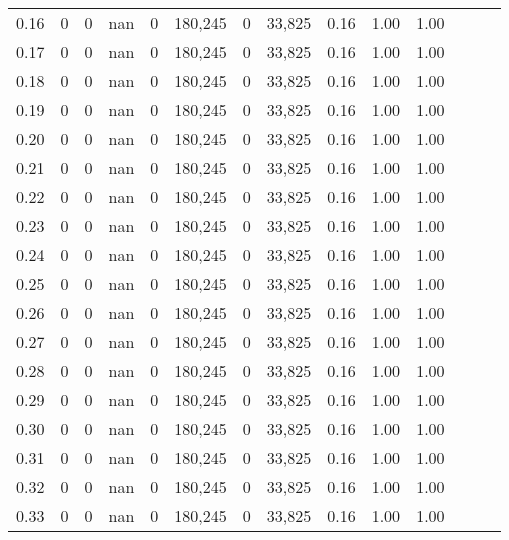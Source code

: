 \begin{tabular}{rrrrrrrrrrrrrr}
0.16 &        0 &       0 &   nan &        0 &  180,245 &       0 &  33,825 &  0.16 &  1.00 &      1.00 \\
0.17 &        0 &       0 &   nan &        0 &  180,245 &       0 &  33,825 &  0.16 &  1.00 &      1.00 \\
0.18 &        0 &       0 &   nan &        0 &  180,245 &       0 &  33,825 &  0.16 &  1.00 &      1.00 \\
0.19 &        0 &       0 &   nan &        0 &  180,245 &       0 &  33,825 &  0.16 &  1.00 &      1.00 \\
0.20 &        0 &       0 &   nan &        0 &  180,245 &       0 &  33,825 &  0.16 &  1.00 &      1.00 \\
0.21 &        0 &       0 &   nan &        0 &  180,245 &       0 &  33,825 &  0.16 &  1.00 &      1.00 \\
0.22 &        0 &       0 &   nan &        0 &  180,245 &       0 &  33,825 &  0.16 &  1.00 &      1.00 \\
0.23 &        0 &       0 &   nan &        0 &  180,245 &       0 &  33,825 &  0.16 &  1.00 &      1.00 \\
0.24 &        0 &       0 &   nan &        0 &  180,245 &       0 &  33,825 &  0.16 &  1.00 &      1.00 \\
0.25 &        0 &       0 &   nan &        0 &  180,245 &       0 &  33,825 &  0.16 &  1.00 &      1.00 \\
0.26 &        0 &       0 &   nan &        0 &  180,245 &       0 &  33,825 &  0.16 &  1.00 &      1.00 \\
0.27 &        0 &       0 &   nan &        0 &  180,245 &       0 &  33,825 &  0.16 &  1.00 &      1.00 \\
0.28 &        0 &       0 &   nan &        0 &  180,245 &       0 &  33,825 &  0.16 &  1.00 &      1.00 \\
0.29 &        0 &       0 &   nan &        0 &  180,245 &       0 &  33,825 &  0.16 &  1.00 &      1.00 \\
0.30 &        0 &       0 &   nan &        0 &  180,245 &       0 &  33,825 &  0.16 &  1.00 &      1.00 \\
0.31 &        0 &       0 &   nan &        0 &  180,245 &       0 &  33,825 &  0.16 &  1.00 &      1.00 \\
0.32 &        0 &       0 &   nan &        0 &  180,245 &       0 &  33,825 &  0.16 &  1.00 &      1.00 \\
0.33 &        0 &       0 &   nan &        0 &  180,245 &       0 &  33,825 &  0.16 &  1.00 &      1.00 \\

\end{tabular}
